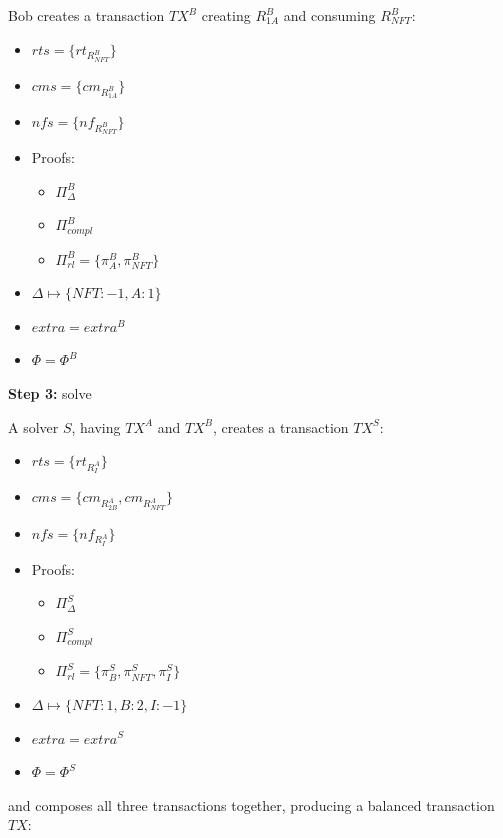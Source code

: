 \documentclass[
    11pt,            %
    techreport,        %
    affiltop,       %
]{art}
\begin{document}
Bob creates a transaction $TX^B$ creating $R^B_{1A}$ and consuming $R^B_{NFT}$:
\begin{itemize}
    \item $rts= \{rt_{R^B_{NFT}}\}$
    \item $cms = \{cm_{R^B_{1A}}\}$
    \item $nfs = \{nf_{R^B_{NFT}}\}$
     \item Proofs:
    \begin{itemize}
        \item $\Pi^B_{\Delta}$
        \item $\Pi^B_{compl}$
        \item $\Pi^B_{rl} = \{\pi^B_A, \pi^B_{NFT}\}$
    \end{itemize}
    \item $\Delta \mapsto \{NFT: -1, A: 1\}$
    \item $extra = extra^B$
    \item $\Phi = \Phi^B$
\end{itemize}

\textbf{Step 3:} solve

A solver $S$, having $TX^A$ and $TX^B$, creates a transaction $TX^S$:

\begin{itemize}
    \item $rts= \{rt_{R^A_{I}}\}$
    \item $cms = \{cm_{R^A_{2B}}, cm_{R^A_{NFT}}\}$
    \item $nfs = \{nf_{R^A_{I}}\}$
         \item Proofs:
    \begin{itemize}
        \item $\Pi^S_{\Delta}$
        \item $\Pi^S_{compl}$
        \item $\Pi^S_{rl} = \{\pi^S_B, \pi^S_{NFT}, \pi^S_I\}$
    \end{itemize}
    \item $\Delta \mapsto \{NFT: 1, B: 2, I: -1\}$
    \item $extra = extra^S$
    \item $\Phi = \Phi^S$
\end{itemize}

and composes all three transactions together, producing a balanced transaction $TX$:
\end{document}
